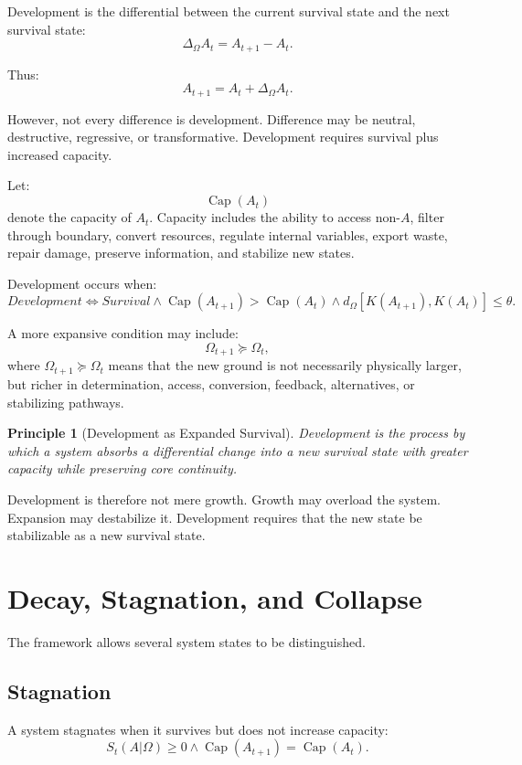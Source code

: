 \documentclass[11pt,a4paper]{article}
\newtheorem{principle}{Principle}
\newcommand{\Capacity}{\operatorname{Cap}}
\begin{document}
Development is the differential between the current survival state and the next survival state:
\[
\Delta_{\Omega}A_t=A_{t+1}-A_t.
\]

Thus:
\[
A_{t+1}=A_t+\Delta_{\Omega}A_t.
\]

However, not every difference is development. Difference may be neutral, destructive, regressive, or transformative. Development requires survival plus increased capacity.

Let:
\[
\Capacity(A_t)
\]
denote the capacity of $A_t$. Capacity includes the ability to access non-$A$, filter through boundary, convert resources, regulate internal variables, export waste, repair damage, preserve information, and stabilize new states.

Development occurs when:
\[
Development
\Longleftrightarrow
Survival
\wedge
\Capacity(A_{t+1})>\Capacity(A_t)
\wedge
d_{\Omega}[K(A_{t+1}),K(A_t)]\leq\theta.
\]

A more expansive condition may include:
\[
\Omega_{t+1}\succeq\Omega_t,
\]
where $\Omega_{t+1}\succeq\Omega_t$ means that the new ground is not necessarily physically larger, but richer in determination, access, conversion, feedback, alternatives, or stabilizing pathways.

\begin{principle}[Development as Expanded Survival]
Development is the process by which a system absorbs a differential change into a new survival state with greater capacity while preserving core continuity.
\end{principle}

Development is therefore not mere growth. Growth may overload the system. Expansion may destabilize it. Development requires that the new state be stabilizable as a new survival state.

\section{Decay, Stagnation, and Collapse}

The framework allows several system states to be distinguished.

\subsection{Stagnation}

A system stagnates when it survives but does not increase capacity:
\[
S_t(A|\Omega)\geq0
\wedge
\Capacity(A_{t+1})=\Capacity(A_t).
\]
\end{document}
